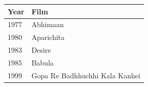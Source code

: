 \documentclass{article}
\begin{document}
\begin{tabular}{ll}
\toprule
Year & Film \\
\midrule
1977 & Abhimaan \\
1980 & Aparichita \\
1983 & Desire \\
1985 & Babula \\
1999 & Gopa Re Badhhuchhi Kala Kanhei \\
\bottomrule
\end{tabular}
\end{document}
